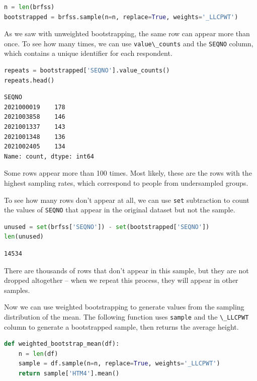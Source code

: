 \begin{lstlisting}[language=Python,style=source]
n = len(brfss)
bootstrapped = brfss.sample(n=n, replace=True, weights='_LLCPWT')
\end{lstlisting}

As we saw with unweighted bootstrapping, the same row can appear more
than once. To see how many times, we can use
\passthrough{\lstinline!value\_counts!} and the
\passthrough{\lstinline!SEQNO!} column, which contains a unique
identifier for each respondent.

\begin{lstlisting}[language=Python,style=source]
repeats = bootstrapped['SEQNO'].value_counts()
repeats.head()
\end{lstlisting}

\begin{lstlisting}[style=output]
SEQNO
2021000019    178
2021003858    146
2021001337    143
2021001348    136
2021002405    134
Name: count, dtype: int64
\end{lstlisting}

Some rows appear more than 100 times. Most likely, these are the rows
with the highest sampling rates, which correspond to people from
undersampled groups.

To see how many rows don't appear at all, we can use
\passthrough{\lstinline!set!} subtraction to count the values of
\passthrough{\lstinline!SEQNO!} that appear in the original dataset but
not the sample.

\begin{lstlisting}[language=Python,style=source]
unused = set(brfss['SEQNO']) - set(bootstrapped['SEQNO'])
len(unused)
\end{lstlisting}

\begin{lstlisting}[style=output]
14534
\end{lstlisting}

There are thousands of rows that don't appear in this sample, but they
are not dropped altogether -- when we repeat this process, they will
appear in other samples.

Now we can use weighted bootstrapping to generate values from the
sampling distribution of the mean. The following function uses
\passthrough{\lstinline!sample!} and the
\passthrough{\lstinline!\_LLCPWT!} column to generate a bootstrapped
sample, then returns the average height.

\begin{lstlisting}[language=Python,style=source]
def weighted_bootstrap_mean(df):
    n = len(df)
    sample = df.sample(n=n, replace=True, weights='_LLCPWT')
    return sample['HTM4'].mean()
\end{lstlisting}

